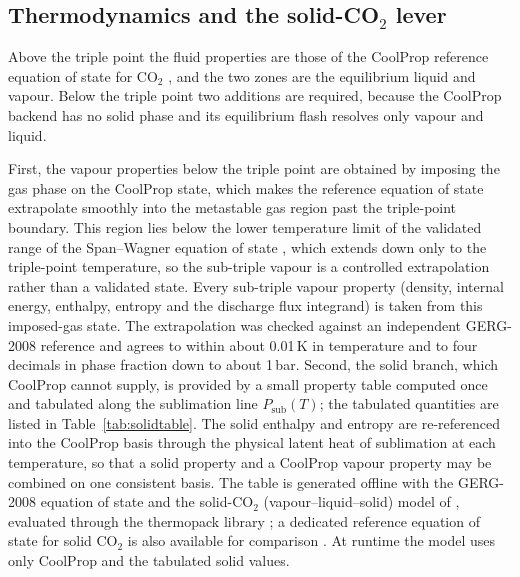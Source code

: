 \documentclass[5p,authoryear]{elsarticle}
\begin{document}
\subsection{Thermodynamics and the solid-\texorpdfstring{CO$_2$}{CO2} lever}
\label{sec:thermo}

Above the triple point the fluid properties are those of the CoolProp reference equation of state
for CO$_2$ \citep{Span1996, Bell2014}, and the two zones are the equilibrium liquid and vapour.
Below the triple point two additions are required, because the CoolProp backend has no solid phase
and its equilibrium flash resolves only vapour and liquid.

First, the vapour properties below the triple point are obtained by imposing the gas phase on the
CoolProp state, which makes the reference equation of state extrapolate smoothly into the
metastable gas region past the triple-point boundary. This region lies below the lower temperature
limit of the validated range of the Span--Wagner equation of state \citep{Span1996}, which extends
down only to the triple-point temperature, so the sub-triple vapour is a controlled extrapolation
rather than a validated state. Every sub-triple vapour property (density, internal energy, enthalpy,
entropy and the discharge flux integrand) is taken from this imposed-gas state. The extrapolation was
checked against an independent GERG-2008 reference \citep{Kunz2012} and agrees to within about
0.01\,K in temperature and to four decimals in phase fraction down to about 1\,bar. Second, the solid branch, which CoolProp cannot supply, is provided by a small property
table computed once and tabulated along the sublimation line $P_\text{sub}(T)$; the tabulated
quantities are listed in Table~\ref{tab:solidtable}. The solid enthalpy and entropy are
re-referenced into the CoolProp basis through the physical latent heat of sublimation at each
temperature, so that a solid property and a CoolProp vapour property may be combined on one
consistent basis. The table is generated offline with the GERG-2008 equation of state
\citep{Kunz2012} and the solid-CO$_2$ (vapour--liquid--solid) model of \citet{Hammer2013}, evaluated
through the thermopack library \citep{Wilhelmsen2017}; a dedicated reference equation of state for
solid CO$_2$ is also available for comparison \citep{JaegerSpan2012}. At runtime the model uses only
CoolProp and the tabulated solid values.
\end{document}

